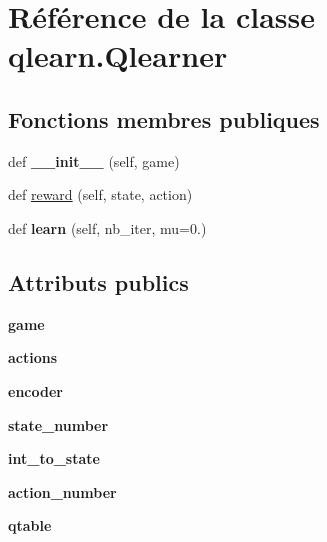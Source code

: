 \hypertarget{classqlearn_1_1Qlearner}{}\section{Référence de la classe qlearn.\+Qlearner}
\label{classqlearn_1_1Qlearner}
\subsection*{Fonctions membres publiques}
\begin{DoxyCompactItemize}
\item 
\mbox{\label{classqlearn_1_1Qlearner_a2358d27a7a8833adaf69138ceda4d7aa}} 
def {\bfseries \+\_\+\+\_\+init\+\_\+\+\_\+} (self, game)
\item 
def \hyperlink{classqlearn_1_1Qlearner_aa5d2c9fb82ed55754cab3f485551ba22}{reward} (self, state, action)
\item 
\mbox{\label{classqlearn_1_1Qlearner_afaa65137b88d1c13b8969036c0a9983f}} 
def {\bfseries learn} (self, nb\+\_\+iter, mu=0.)
\end{DoxyCompactItemize}
\subsection*{Attributs publics}
\begin{DoxyCompactItemize}
\item 
\mbox{\label{classqlearn_1_1Qlearner_a69b12b006548c4ea15e63f5e22af8708}} 
{\bfseries game}
\item 
\mbox{\label{classqlearn_1_1Qlearner_a27bf7d240f5a715866a7dc249dd0bacb}} 
{\bfseries actions}
\item 
\mbox{\label{classqlearn_1_1Qlearner_a2eba21289650ffb2d6fd99ecfac97e63}} 
{\bfseries encoder}
\item 
\mbox{\label{classqlearn_1_1Qlearner_a8bbd7e43cb52617447d6ddb6b67aed79}} 
{\bfseries state\+\_\+number}
\item 
\mbox{\label{classqlearn_1_1Qlearner_ad83c3b921b20c82bd5e6aa3ac550b4a5}} 
{\bfseries int\+\_\+to\+\_\+state}
\item 
\mbox{\label{classqlearn_1_1Qlearner_a590de5eb34ceb094ad2ce575064a46c1}} 
{\bfseries action\+\_\+number}
\item 
\mbox{\label{classqlearn_1_1Qlearner_a85cd72fc90598ce1036f3bfbf1e19cc8}} 
{\bfseries qtable}
\end{DoxyCompactItemize}


